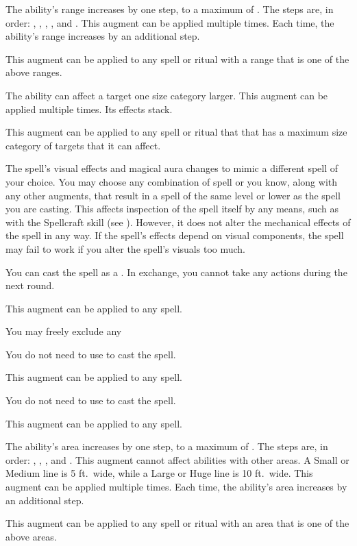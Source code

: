              The ability's range increases by one step, to a maximum of \rngext.
            The steps are, in order: \rngtouch, \rngclose, \rngmed, \rnglong, and \rngext.
            This augment can be applied multiple times.
            Each time, the ability's range increases by an additional step.
            \par This augment can be applied to any spell or ritual with a range that is one of the above ranges.

             The ability can affect a target one size category larger.
            This augment can be applied multiple times.
            Its effects stack.
            \par This augment can be applied to any spell or ritual that that has a maximum size category of targets that it can affect.

             The spell's visual effects and magical aura changes to mimic a different spell of your choice.
            You may choose any combination of spell or  you know, along with any other augments, that result in a spell of the same level or lower as the spell you are casting.
            This affects inspection of the spell itself by any means, such as with the Spellcraft skill (see ).
            However, it does not alter the mechanical effects of the spell in any way.
            If the spell's effects depend on visual components, the spell may fail to work if you alter the spell's visuals too much. 

             You can cast the spell as a .
            In exchange, you cannot take any actions during the next round.
            \par This augment can be applied to any spell.

             You may freely exclude any 

             You do not need to use  to cast the spell.
            \par This augment can be applied to any spell.

             You do not need to use  to cast the spell.
            \par This augment can be applied to any spell.

             The ability's area increases by one step, to a maximum of \areahuge.
            The steps are, in order: \areasmall, \areamed, \arealarge, and \areahuge.
            This augment cannot affect abilities with other areas.
            A Small or Medium line is 5 ft.\ wide, while a Large or Huge line is 10 ft.\ wide.
            This augment can be applied multiple times.
            Each time, the ability's area increases by an additional step.
            \par This augment can be applied to any spell or ritual with an area that is one of the above areas.

